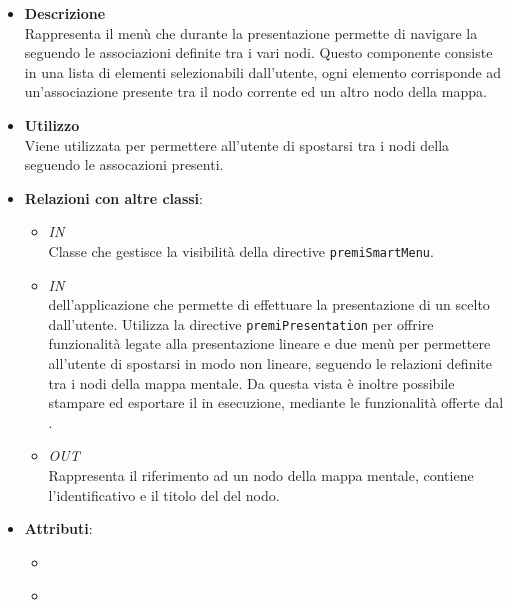 \begin{itemize}
\item \textbf{Descrizione}\\
Rappresenta il menù che durante la presentazione permette di navigare la  seguendo le associazioni definite tra i vari nodi.
Questo componente consiste in una lista di elementi selezionabili dall’utente, ogni elemento corrisponde ad un'associazione presente tra il nodo corrente ed un altro nodo della mappa.
\item \textbf{Utilizzo}\\
Viene utilizzata per permettere all'utente di spostarsi tra i nodi della  seguendo le assocazioni presenti.
\item \textbf{Relazioni con altre classi}:
\begin{itemize}
\item \textit{IN} \hyperref[\nogloxy{Premi::Front-End::Controllers::SmartMenuController}]{}\\
Classe che gestisce la visibilità della directive \texttt{premiSmartMenu}.
\item \textit{IN} \hyperref[\nogloxy{Premi::Front-End::Views::PresentationView}]{}\\
 dell’applicazione che permette di effettuare la presentazione di un  scelto dall’utente. Utilizza la directive \texttt{premiPresentation} per offrire funzionalità legate alla presentazione lineare e due menù per permettere all'utente di spostarsi in modo non lineare, seguendo le relazioni definite tra i nodi della mappa mentale.
Da questa vista è inoltre possibile stampare ed esportare il  in esecuzione, mediante le funzionalità offerte dal .
\item \textit{OUT} \hyperref[\nogloxy{Premi::Front-End::Model::NodeReference}]{}\\
Rappresenta il riferimento ad un nodo della mappa mentale, contiene l'identificativo e il titolo del del nodo.
\end{itemize}
\item \textbf{Attributi}:
\begin{itemize}
\item {}
\\ \dpDirectiveController
\item {}
\\ \dpRestrict

\end{itemize}
\end{itemize}
